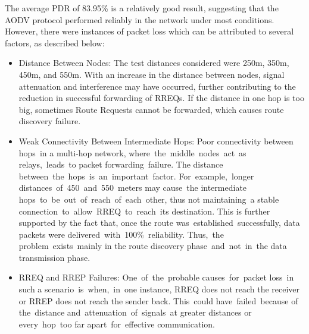\documentclass[]{nsm-thesis}
\begin{document}
The average PDR of 83.95\% is a relatively good result, suggesting that the AODV protocol performed reliably in the network under most conditions. However, there were instances of packet loss which can be attributed to several factors, as described below:
\begin{itemize}
    \item Distance Between Nodes: The test distances considered were 250m, 350m, 450m, and 550m. With an increase in the distance between nodes, signal attenuation and interference may have occurred, further contributing to the reduction in successful forwarding of RREQs. If the distance in one hop is too big, sometimes Route Requests cannot be forwarded, which causes route discovery failure.
    \item Weak Connectivity Between Intermediate Hops: Poor connectivity between hops in a multi-hop network, where the middle nodes act as relays, leads to packet forwarding failure. The distance between the hops is an important factor. For example, longer distances of 450 and 550 meters may cause the intermediate hops to be out of reach of each other, thus not maintaining a stable connection to allow RREQ to reach its destination. This is further supported by the fact that, once the route was established successfully, data packets were delivered with 100\% reliability. Thus, the problem exists mainly in the route discovery phase and not in the data transmission phase.
    \item RREQ and  RREP Failures: One of the probable causes for packet loss in such a scenario is when, in one instance, RREQ does not reach the receiver or RREP does not reach the sender back. This could have failed because of the distance and attenuation of signals at greater distances or every hop too far apart for effective communication.
\end{itemize}
\end{document}
